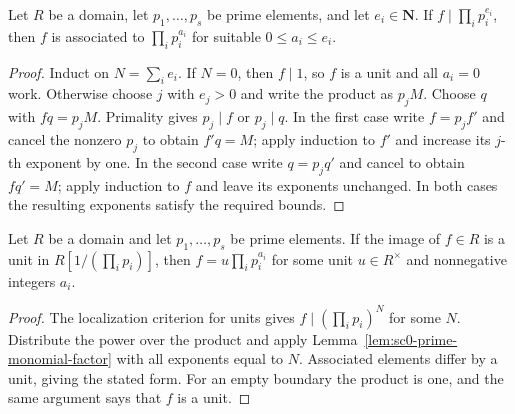 \begin{lemma}\label{lem:sc0-prime-monomial-factor}
\leanok
Let $R$ be a domain, let $p_1,\ldots,p_s$ be prime elements, and let $e_i\in\mathbf N$.
If $f\mid\prod_i p_i^{e_i}$, then $f$ is associated to $\prod_i p_i^{a_i}$ for suitable
$0\le a_i\le e_i$.
\end{lemma}
\begin{proof}
Induct on $N=\sum_i e_i$. If $N=0$, then $f\mid1$, so $f$ is a unit and all $a_i=0$ work.
Otherwise choose $j$ with $e_j>0$ and write the product as $p_jM$. Choose $q$ with $fq=p_jM$.
Primality gives $p_j\mid f$ or $p_j\mid q$. In the first case write $f=p_jf'$ and cancel the
nonzero $p_j$ to obtain $f'q=M$; apply induction to $f'$ and increase its $j$-th exponent by one.
In the second case write $q=p_jq'$ and cancel to obtain $fq'=M$; apply induction to $f$ and leave
its exponents unchanged. In both cases the resulting exponents satisfy the required bounds.
\end{proof}

\begin{lemma}\label{lem:sc0-unit-away-monomial}
\leanok
{}
Let $R$ be a domain and let $p_1,\ldots,p_s$ be prime elements. If the image of $f\in R$
is a unit in $R[1/(\prod_i p_i)]$, then $f=u\prod_i p_i^{a_i}$ for some unit $u\in R^\times$
and nonnegative integers $a_i$.
\end{lemma}
\begin{proof}
The localization criterion for units gives $f\mid(\prod_i p_i)^N$ for some $N$.
Distribute the power over the product and apply Lemma~\ref{lem:sc0-prime-monomial-factor}
with all exponents equal to $N$. Associated elements differ by a unit, giving the stated form.
For an empty boundary the product is one, and the same argument says that $f$ is a unit.
\end{proof}

